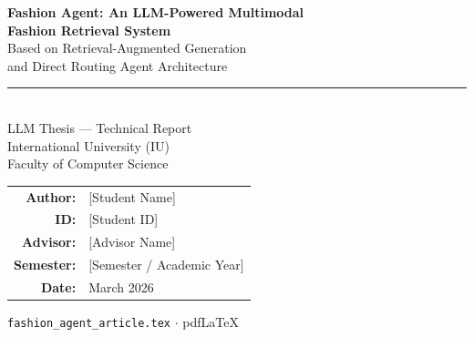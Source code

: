 \documentclass[12pt,a4paper]{article}
\begin{document}
\begin{titlepage}
\centering
\vspace*{1.5cm}

{\Large\bfseries\color{agentblue}
  Fashion Agent: An LLM-Powered Multimodal\\[6pt]
  Fashion Retrieval System}\\[0.8cm]

{\large Based on Retrieval-Augmented Generation\\
and Direct Routing Agent Architecture}\\[1.5cm]

\rule{0.6\textwidth}{1pt}\\[1.5cm]

{\large LLM Thesis --- Technical Report}\\[0.5cm]
{\normalsize International University (IU)\\
Faculty of Computer Science}\\[2cm]

\begin{tabular}{rl}
  \textbf{Author:}   & [Student Name] \\[4pt]
  \textbf{ID:}       & [Student ID] \\[4pt]
  \textbf{Advisor:}  & [Advisor Name] \\[4pt]
  \textbf{Semester:} & [Semester / Academic Year] \\[4pt]
  \textbf{Date:}     & March 2026 \\
\end{tabular}

\vfill
{\small\color{gray}
  \texttt{fashion\_agent\_article.tex} $\cdot$ pdfLaTeX}
\end{titlepage}

\begin{abstract}
\noindent
We present \textbf{Fashion Agent}, an intelligent multimodal fashion
retrieval system that combines Retrieval-Augmented Generation (RAG)
with a deterministic \emph{Direct Routing} orchestration layer.
The system evolves through two phases:
\emph{RAG v1.0}, a fixed nine-step hybrid-search pipeline using
BM25 and Marqo-FashionSigLIP (768-d) vector embeddings; and
\emph{Agent v2.0}, which introduces intent classification,
a template-based slot gate, session memory backed by PostgreSQL,
and a direct Gemini 2.5 Flash orchestrator requiring only 1--2 LLM
calls per conversational turn --- with no iterative ReAct loop.
A BAAI/BGE cross-encoder reranker further improves retrieval precision.
End-to-end evaluation targets show Hit Rate@5 $\geq 93\%$,
MRR $\geq 0.80$, and a P95 latency under 15 seconds.
The Clothie Web frontend (Flutter, served via Nginx) connects to the
FastAPI backend over a Cloudflare Tunnel.
This article details the technical architecture, processing
workflows, and key design decisions behind the system.
\end{abstract}
\end{document}
